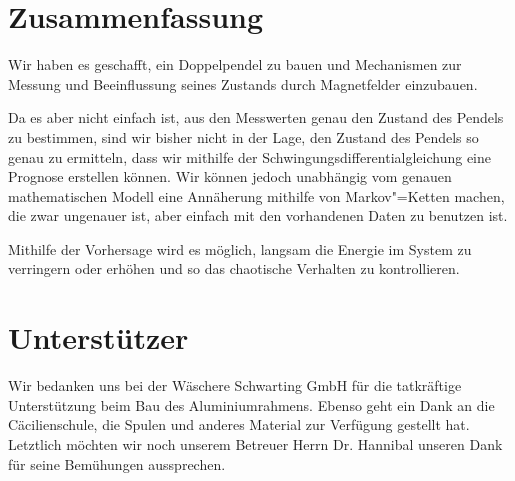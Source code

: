 \documentclass[a4paper, 10pt]{article}
\begin{document}




\section{Zusammenfassung}
Wir haben es geschafft, ein Doppelpendel zu bauen und Mechanismen zur Messung und Beeinflussung seines
Zustands durch Magnetfelder einzubauen.

Da es aber nicht einfach ist, aus den Messwerten genau den
Zustand des Pendels zu bestimmen, sind wir bisher nicht in der Lage, den Zustand des Pendels so genau
zu ermitteln, dass wir mithilfe der Schwingungsdifferentialgleichung eine Prognose erstellen können. Wir
können jedoch unabhängig vom genauen mathematischen Modell eine Annäherung mithilfe von Markov"=Ketten machen, die zwar ungenauer ist, aber einfach mit den vorhandenen Daten zu benutzen ist.

Mithilfe der Vorhersage wird es möglich, langsam die Energie im System zu verringern oder erhöhen und so das chaotische Verhalten zu kontrollieren.

\section*{Unterstützer}

Wir bedanken uns bei der Wäschere Schwarting GmbH für die tatkräftige Unterstützung beim Bau des Aluminiumrahmens.
Ebenso geht ein Dank an die Cäcilienschule, die Spulen und anderes Material zur Verfügung gestellt hat.
Letztlich möchten wir noch unserem Betreuer Herrn Dr. Hannibal unseren Dank für seine Bemühungen aussprechen.


{}
\end{document}
